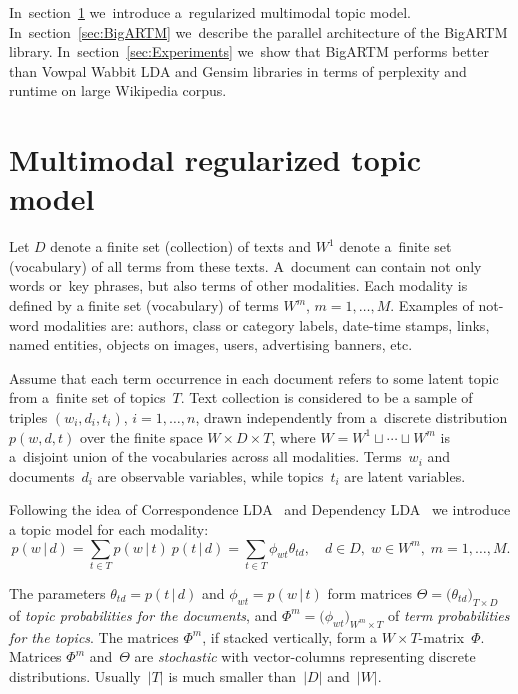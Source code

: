 \documentclass[russian,english]{llncs}
\newcommand{\cond}{\mspace{3mu}{|}\mspace{3mu}}
\begin{document}
In~section~\ref{sec:Multimodal}
we~introduce a~regularized multimodal topic model.
In~section~\ref{sec:BigARTM}
we~describe the parallel architecture of the BigARTM library.
In~section~\ref{sec:Experiments}
we~show that BigARTM performs better than Vowpal Wabbit LDA and Gensim libraries
in terms of perplexity and runtime on large Wikipedia corpus.

\section{Multimodal regularized topic model}
\label{sec:Multimodal}


Let
$D$ denote a finite set (collection) of texts and
$W^1$ denote a~finite set (vocabulary) of all terms from these texts.
A~document can contain not only words or~key phrases, but also terms of other modalities.
Each modality is defined by a finite set (vocabulary) of terms $W^m$, ${m=1,\dots,M}$.
Examples of not-word modalities are:
authors,
class or category labels,
date-time stamps,
links,
named entities,
objects on images,
users,
advertising banners,
etc.

Assume that
each term occurrence in each document refers to some latent topic from a~finite set of topics~$T$.
Text collection is considered to be a sample of triples
$(w_i,d_i,t_i)$,\; ${i=1,\dots,n}$,
drawn independently from a~discrete distribution $p(w,d,t)$ over the finite space $W\times D \times T$,
where ${W=W^1\sqcup\cdots\sqcup W^m}$ is a~disjoint union of the vocabularies across all modalities.
Terms~$w_i$ and documents~$d_i$ are observable variables,
while topics~$t_i$ are latent variables.

Following the idea of Correspondence LDA~\cite{blei03modeling}
and Dependency LDA~\cite{rubin12statistical}
we introduce a topic model for each modality:
\[
    p(w\cond d)
    = \sum_{t\in T} p(w\cond t)\: p(t\cond d)
    = \sum_{t\in T} \phi_{wt} \theta_{td},
    \quad
    d\in D,\; w\in W^m,\; m=1,\dots,M.
\]

The parameters
${\theta_{td}=p(t\cond d)}$ and ${\phi_{wt}=p(w\cond t)}$
form matrices
${\Theta = \bigl( \theta_{td} \bigr)_{T\times D}}$ of \emph{topic probabilities for the documents}, and
${\Phi^m = \bigl( \phi_{wt} \bigr)_{W^m\times T}}$ of \emph{term probabilities for the topics}.
The matrices $\Phi^m$, if stacked vertically, form a ${W\!\!\times\!T}$-matrix~$\Phi$.
Matrices $\Phi^m$ and~$\Theta$ are \emph{stochastic}
with vector-columns representing discrete distributions.
Usually~$|T|$ is much smaller than~$|D|$ and~$|W|$.
\end{document}
